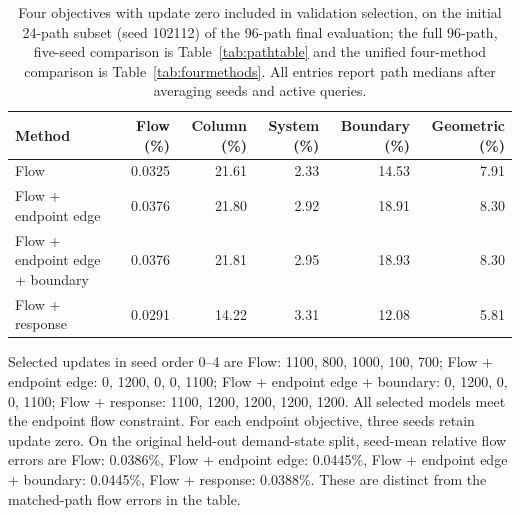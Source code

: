 \begin{table}[t]\centering\footnotesize
\caption{Four objectives with update zero included in validation selection, on the initial 24-path subset (seed 102112) of the 96-path final evaluation; the full 96-path, five-seed comparison is Table~\ref{tab:pathtable} and the unified four-method comparison is Table~\ref{tab:fourmethods}. All entries report path medians after averaging seeds and active queries.}
\label{tab:pairs-v102}
\begin{tabular}{lrrrrr}\toprule Method & Flow (\%) & Column (\%) & System (\%) & Boundary (\%) & Geometric (\%)\\\midrule
Flow & 0.0325 & 21.61 & 2.33 & 14.53 & 7.91\\
Flow + endpoint edge & 0.0376 & 21.80 & 2.92 & 18.91 & 8.30\\
Flow + endpoint edge + boundary & 0.0376 & 21.81 & 2.95 & 18.93 & 8.30\\
Flow + response & 0.0291 & 14.22 & 3.31 & 12.08 & 5.81\\
\bottomrule\end{tabular}\end{table}
Selected updates in seed order 0--4 are Flow: 1100, 800, 1000, 100, 700; Flow + endpoint edge: 0, 1200, 0, 0, 1100; Flow + endpoint edge + boundary: 0, 1200, 0, 0, 1100; Flow + response: 1100, 1200, 1200, 1200, 1200. All selected models meet the endpoint flow constraint. For each endpoint objective, three seeds retain update zero.
On the original held-out demand-state split, seed-mean relative flow errors are Flow: 0.0386\%, Flow + endpoint edge: 0.0445\%, Flow + endpoint edge + boundary: 0.0445\%, Flow + response: 0.0388\%. These are distinct from the matched-path flow errors in the table.
